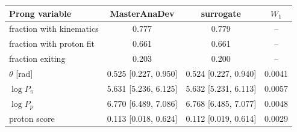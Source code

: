 \begin{tabular}{lccc}
\toprule
Prong variable & MasterAnaDev & surrogate & $W_1$ \\
\midrule
fraction with kinematics & 0.777 & 0.779 & -- \\
fraction with proton fit & 0.661 & 0.661 & -- \\
fraction exiting & 0.203 & 0.200 & -- \\
$\theta$ [rad] & 0.525 [0.227, 0.950] & 0.524 [0.227, 0.940] & 0.0041 \\
$\log P_\pi$ & 5.631 [5.236, 6.125] & 5.632 [5.231, 6.113] & 0.0057 \\
$\log P_p$ & 6.770 [6.489, 7.086] & 6.768 [6.485, 7.077] & 0.0048 \\
proton score & 0.113 [0.018, 0.624] & 0.112 [0.019, 0.614] & 0.0029 \\
\bottomrule
\end{tabular}
